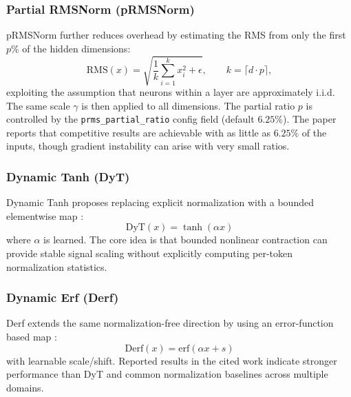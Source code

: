 \subsubsection{Partial RMSNorm (pRMSNorm)}
pRMSNorm \citep{zhang_root_2019} further reduces overhead by estimating the RMS from only the first $p$\% of the hidden dimensions:
\[
\mathrm{RMS}(x)=\sqrt{\frac{1}{k}\sum_{i=1}^{k}x_i^2+\epsilon},\qquad k=\lceil d\cdot p\rceil,
\]
exploiting the assumption that neurons within a layer are approximately i.i.d. The same scale $\gamma$ is then applied to all dimensions. The partial ratio $p$ is controlled by the \texttt{prms\_partial\_ratio} config field (default $6.25\%$). The paper reports that competitive results are achievable with as little as $6.25\%$ of the inputs, though gradient instability can arise with very small ratios.

\subsubsection{Dynamic Tanh (DyT)}
Dynamic Tanh proposes replacing explicit normalization with a bounded elementwise map \citep{zhu_transformers_2025}:
\[
\mathrm{DyT}(x)=\tanh(\alpha x)
\]
where $\alpha$ is learned. The core idea is that bounded nonlinear contraction can provide stable signal scaling without explicitly computing per-token normalization statistics.

\subsubsection{Dynamic Erf (Derf)}
Derf extends the same normalization-free direction by using an error-function based map \citep{chen_stronger_2025}:
\[
\mathrm{Derf}(x)=\mathrm{erf}(\alpha x+s)
\]
with learnable scale/shift. Reported results in the cited work indicate stronger performance than DyT and common normalization baselines across multiple domains.

